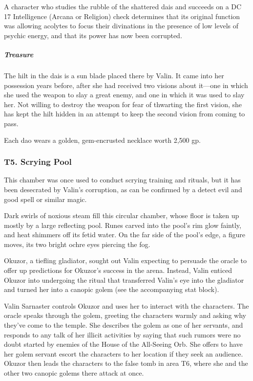 \documentclass[10pt,a4paper,twoside,bg=print,twocolumn,openany,nodeprecatedcode]{dndbook}
\begin{document}
A character who studies the rubble of the shattered dais and succeeds on a DC 17 Intelligence (Arcana or Religion) check determines that its original function was allowing acolytes to focus their divinations in the presence of low levels of psychic energy, and that its power has now been corrupted.

\subparagraph{Treasure}
The hilt in the dais is a sun blade placed there by Valin. It came into her possession years before, after she had received two visions about it—one in which she used the weapon to slay a great enemy, and one in which it was used to slay her. Not willing to destroy the weapon for fear of thwarting the first vision, she has kept the hilt hidden in an attempt to keep the second vision from coming to pass.

Each dao wears a golden, gem-encrusted necklace worth 2,500 gp.

\subsubsection{T5. Scrying Pool}
This chamber was once used to conduct scrying training and rituals, but it has been desecrated by Valin's corruption, as can be confirmed by a detect evil and good spell or similar magic.

\begin{DndReadAloud}{}
Dark swirls of noxious steam fill this circular chamber, whose floor is taken up mostly by a large reflecting pool. Runes carved into the pool's rim glow faintly, and heat shimmers off its fetid water. On the far side of the pool's edge, a figure moves, its two bright ochre eyes piercing the fog.

\end{DndReadAloud}

Okuzor, a tiefling gladiator, sought out Valin expecting to persuade the oracle to offer up predictions for Okuzor's success in the arena. Instead, Valin enticed Okuzor into undergoing the ritual that transferred Valin's eye into the gladiator and turned her into a canopic golem (see the accompanying stat block).

Valin Sarnaster controls Okuzor and uses her to interact with the characters. The oracle speaks through the golem, greeting the characters warmly and asking why they've come to the temple. She describes the golem as one of her servants, and responds to any talk of her illicit activities by saying that such rumors were no doubt started by enemies of the House of the All-Seeing Orb. She offers to have her golem servant escort the characters to her location if they seek an audience. Okuzor then leads the characters to the false tomb in area T6, where she and the other two canopic golems there attack at once.
\end{document}
